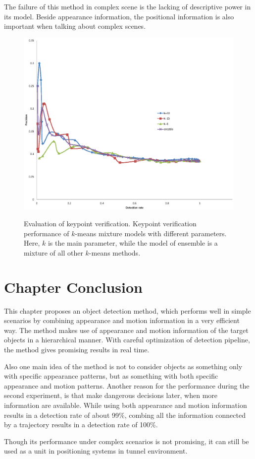 The failure of this method in complex scene is the lacking of descriptive power in its model. Beside appearance information, the positional information is also important when talking about complex scenes.

\begin{figure}
\centering
{
  \includegraphics[width=1\textwidth]{kptkms.eps}
}
\caption[Evaluation of keypoint verification]{Evaluation of keypoint verification. Keypoint verification performance of $k$-means mixture models with different parameters. Here, $k$ is the main parameter, while the model of ensemble is a mixture of all other $k$-means methods.}
\label{ord:one}
\end{figure}

\section{Chapter Conclusion}
\label{conc}
 This chapter proposes an object detection method, which performs well in simple scenarios by combining appearance and motion information in a very efficient way. The method makes use of appearance and motion information of the target objects in a hierarchical manner. With careful optimization of detection pipeline, the method gives promising results in real time.

  Also one main idea of the method is not to consider objects as something only with specific appearance patterns, but as something with both
 specific appearance and motion patterns. Another reason for the performance during the second experiment, is that make dangerous decisions later, when more information are available. While using both appearance and motion information results in a detection rate of about 99\%, combing all the information connected by a trajectory results in a detection rate of 100\%.

 Though its performance under complex scenarios is not promising, it can still be used as a unit in  positioning systems in tunnel environment.
